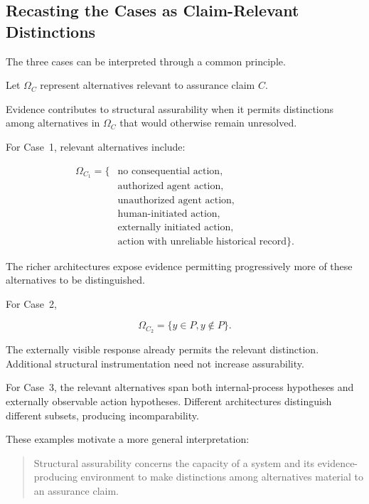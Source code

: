 \subsection{Recasting the Cases as Claim-Relevant Distinctions}
\label{aa.subsec.case-distinctions}

The three cases can be interpreted through a common principle.

Let \(\Omega_C\) represent alternatives relevant to assurance claim \(C\).

Evidence contributes to structural assurability when it permits
distinctions among alternatives in \(\Omega_C\) that would otherwise
remain unresolved.

For Case~1, relevant alternatives include:

\begin{equation}
  \begin{aligned}
    \Omega_{C_1}
    =
    \{ &
    \text{no consequential action},     \\
       &
    \text{authorized agent action},     \\
       &
    \text{unauthorized agent action},   \\
       &
    \text{human-initiated action},      \\
       &
    \text{externally initiated action}, \\
       &
    \text{action with unreliable historical record}
    \}.
  \end{aligned}
\end{equation}

The richer architectures expose evidence permitting progressively more
of these alternatives to be distinguished.

For Case~2,

\begin{equation}
  \Omega_{C_2}
  =
  \{
  y\in P,
  y\notin P
  \}.
\end{equation}

The externally visible response already permits the relevant distinction.
Additional structural instrumentation need not increase assurability.

For Case~3, the relevant alternatives span both internal-process
hypotheses and externally observable action hypotheses.
Different architectures distinguish different subsets, producing
incomparability.

These examples motivate a more general interpretation:

\begin{quote}
  Structural assurability concerns the capacity of a system and
  its evidence-producing environment to make distinctions among
  alternatives material to an assurance claim.
\end{quote}

